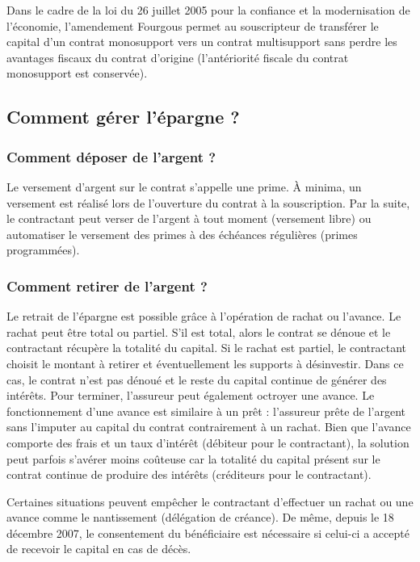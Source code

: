 \documentclass{article}
\newcommand{\blackFrame}[2]{
    \begin{tcolorbox}[colback=white,colframe=black!100!white,title={#1}]
        #2
    \end{tcolorbox}
}
\begin{document}

\blackFrame{Amendement Fourgous}{
Dans le cadre de la loi du 26 juillet 2005 pour la confiance et la modernisation de l'économie, l'amendement Fourgous permet au souscripteur de transférer le capital d'un contrat monosupport vers un contrat multisupport sans perdre les avantages fiscaux du contrat d'origine (l'antériorité fiscale du contrat monosupport est conservée).
}

\subsection{Comment gérer l'épargne ?}
\subsubsection{Comment déposer de l'argent ?}
Le versement d'argent sur le contrat s'appelle une prime. À minima, un versement est réalisé lors de l'ouverture du contrat à la souscription. Par la suite, le contractant peut verser de l'argent à tout moment (versement libre) ou automatiser le versement des primes à des échéances régulières (primes programmées).

\subsubsection{Comment retirer de l'argent ?}
Le retrait de l'épargne est possible grâce à l'opération de rachat ou l'avance. Le rachat peut être total ou partiel. S'il est total, alors le contrat se dénoue et le contractant récupère la totalité du capital. Si le rachat est partiel, le contractant choisit le montant à retirer et éventuellement les supports à désinvestir. Dans ce cas, le contrat n'est pas dénoué et le reste du capital continue de générer des intérêts. Pour terminer, l'assureur peut également octroyer une avance. Le fonctionnement d'une avance est similaire à un prêt : l'assureur prête de l'argent sans l'imputer au capital du contrat contrairement à un rachat. Bien que l'avance comporte des frais et un taux d'intérêt (débiteur pour le contractant), la solution peut parfois s'avérer moins coûteuse car la totalité du capital présent sur le contrat continue de produire des intérêts (créditeurs pour le contractant).

\blackFrame{Cas particuliers}{
    Certaines situations peuvent empêcher le contractant d'effectuer un rachat ou une avance comme le nantissement (délégation de créance). De même, depuis le 18 décembre 2007, le consentement du bénéficiaire est nécessaire si celui-ci a accepté de recevoir le capital en cas de décès.
}
\end{document}
